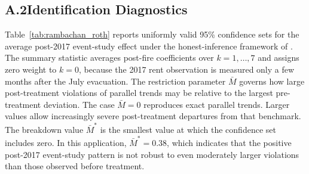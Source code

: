 \documentclass[12pt]{article}
\begin{document}
\FloatBarrier

\subsection*{A.2\quad Identification Diagnostics}
\label{sec:appendix_iv}

Table~\ref{tab:rambachan_roth} reports uniformly valid 95\% confidence sets for
the average post-2017 event-study effect under the honest-inference framework of
\citet{rambachan2023}. The summary statistic averages post-fire coefficients
over $k=1,\ldots,7$ and assigns zero weight to $k=0$, because the 2017 rent
observation is measured only a few months after the July evacuation. The
restriction parameter $\bar{M}$ governs how large post-treatment violations of
parallel trends may be relative to the largest pre-treatment deviation. The case
$\bar{M}=0$ reproduces exact parallel trends. Larger values allow increasingly
severe post-treatment departures from that benchmark. The breakdown value
$\bar{M}^{*}$ is the smallest value at which the confidence set includes zero. In
this application, $\bar{M}^{*}=0.38$, which indicates that the positive
post-2017 event-study pattern is not robust to even moderately larger violations
than those observed before treatment.
\end{document}

